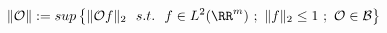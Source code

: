 \begin{equation}
	\Vert \mathcal{O}\Vert:=sup\left\{\Vert \mathcal{O}f\Vert_{2}~~s.t.~~f\in L^{2}(\RR^{m})~;~\Vert f\Vert_{2}\leq 1~;~\mathcal{O}\in\mathcal{B}\right\}
\end{equation}

